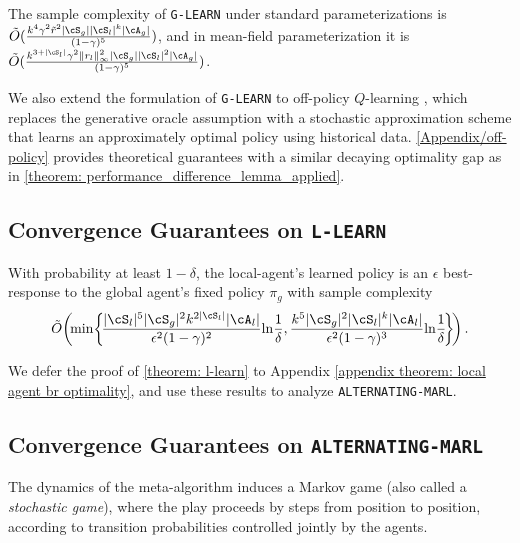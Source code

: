 The sample complexity of \texttt{G-LEARN} under standard parameterizations is $\tilde{O}(\frac{k^4\gamma^2 \tilde{r}^2 |\cS_g| |\cS_l|^k |\cA_g|}{(1-\gamma)^5})$, and in mean-field parameterization it is $\tilde{O}(\frac{k^{3+|\cS_l|}\gamma^2\|r_l\|^2_\infty |\cS_g| |\cS_l|^2 |\cA_g|}{(1-\gamma)^5})$.

\begin{remark} We also extend the formulation of \texttt{G-LEARN} to off-policy $Q$-learning \cite{chen2021lyapunov,chen2022sample}, which replaces the generative oracle assumption with a stochastic approximation scheme that learns an approximately optimal policy using historical data. \cref{Appendix/off-policy} provides theoretical guarantees with a similar decaying optimality gap as in \cref{theorem: performance_difference_lemma_applied}. \end{remark}


\subsection{Convergence Guarantees on \texttt{L-LEARN}}

\begin{theorem} \label{theorem: l-learn}With probability at least $1-\delta$, the local-agent's learned policy is an $\epsilon$ best-response to the global agent's fixed policy $\pi_g$ with sample complexity
\[\tilde{O}\!\left(\!\min\!\left\{\!\frac{|\cS_l|^5|\cS_g|^2 k^{2|\cS_l|}|\cA_l|}{\epsilon^2(1-\gamma)^2} \!\ln\!\frac1\delta, \frac{k^5  |\cS_g|^2 |\cS_l|^k |\cA_l|}{\epsilon^2(1-\gamma)^3}\!\ln\!\frac1\delta\!\right\}\!\right).\]   
\end{theorem} 

We defer the proof of \cref{theorem: l-learn} to Appendix \ref{appendix theorem: local agent br optimality}, and use these results to analyze \texttt{ALTERNATING-MARL}.

 \subsection{Convergence Guarantees on {\texttt{ALTERNATING-MARL}}}


The dynamics of the meta-algorithm induces a Markov game (also called a \emph{stochastic game}), where the play proceeds by steps from position to position, according to transition probabilities controlled jointly by the agents.

